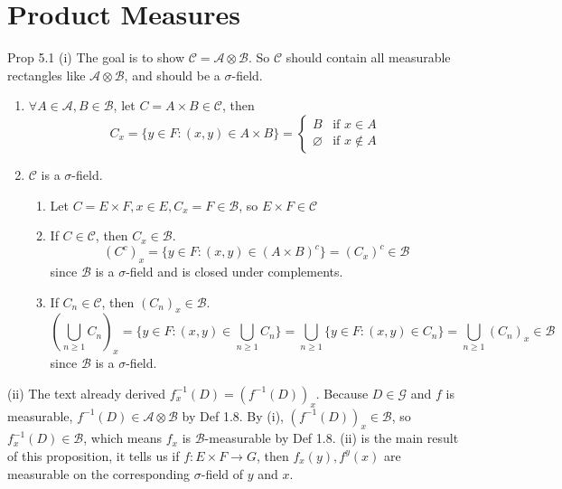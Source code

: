 \setcounter{section}{4}
\section{Product Measures}

\begin{note}{Prop 5.1}
    (i) The goal is to show $\mathcal{C}=\mathcal{A}\otimes \mathcal{B}$. So $\mathcal{C}$ should contain all measurable rectangles like $\mathcal{A}\otimes \mathcal{B}$, and should be a $\sigma$-field.
    \begin{enumerate}
        \item $\forall A\in\mathcal{A},B\in\mathcal{B}$, let $C=A\times B\in\mathcal{C}$, then
        \[
        C_x=\{y\in F:(x,y)\in A\times B\}=\begin{cases}
            B & \text{if } x\in A\\
            \varnothing & \text{if } x\notin A
        \end{cases}
        \]
        \item $\mathcal{C}$ is a $\sigma$-field.
        \begin{enumerate}
            \item Let $C=E\times F,x\in E,C_x=F\in\mathcal{B}$, so $E\times F\in\mathcal{C}$
            \item If $C\in\mathcal{C}$, then $C_x\in\mathcal{B}$.
            \[
            (C^c)_x=\{y\in F:(x,y)\in (A\times B)^c\}=(C_x)^c\in\mathcal{B}
            \]
            since $\mathcal{B}$ is a $\sigma$-field and is closed under complements.
            \item If $C_n\in\mathcal{C}$, then $(C_n)_x\in\mathcal{B}$.
            \[
            \left(
            \bigcup_{n\ge 1}C_n
            \right)_x
            =\{y\in F:(x,y)\in\bigcup_{n\ge 1}C_n\}
            =\bigcup_{n\ge 1}\{y\in F:(x,y)\in C_n\}
            =\bigcup_{n\ge 1}(C_n)_x\in\mathcal{B}
            \]
            since $\mathcal{B}$ is a $\sigma$-field.
        \end{enumerate}
    \end{enumerate}
    (ii) The text already derived $f_x^{-1}(D)=(f^{-1}(D))_x$. Because $D\in\mathcal{G}$ and $f$ is measurable, $f^{-1}(D)\in \mathcal{A}\otimes\mathcal{B}$ by Def 1.8. By (i), $(f^{-1}(D))_x\in\mathcal{B}$, so $f_x^{-1}(D)\in\mathcal{B}$, which means $f_x$ is $\mathcal{B}$-measurable by Def 1.8. (ii) is the main result of this proposition, it tells us if $f:E\times F\to G$, then $f_x(y), f^y(x)$ are measurable on the corresponding $\sigma$-field of $y$ and $x$.
\end{note}


